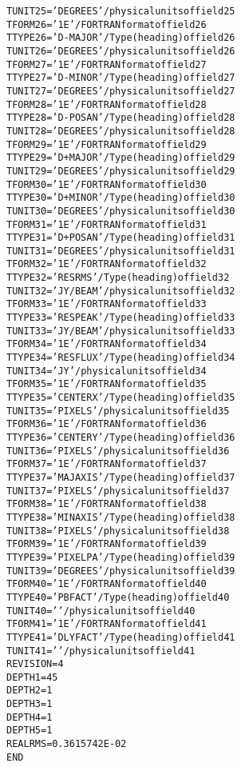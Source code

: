 \documentclass[twoside]{article}
\begin{document}
\begin{alltt}
TUNIT25 = 'DEGREES '           / physical units of field 25
TFORM26 = '1E      '           / FORTRAN format of field 26
TTYPE26 = 'D- MAJOR        '   / Type (heading) of field 26
TUNIT26 = 'DEGREES '           / physical units of field 26
TFORM27 = '1E      '           / FORTRAN format of field 27
TTYPE27 = 'D- MINOR        '   / Type (heading) of field 27
TUNIT27 = 'DEGREES '           / physical units of field 27
TFORM28 = '1E      '           / FORTRAN format of field 28
TTYPE28 = 'D- POSAN        '   / Type (heading) of field 28
TUNIT28 = 'DEGREES '           / physical units of field 28
TFORM29 = '1E      '           / FORTRAN format of field 29
TTYPE29 = 'D+ MAJOR        '   / Type (heading) of field 29
TUNIT29 = 'DEGREES '           / physical units of field 29
TFORM30 = '1E      '           / FORTRAN format of field 30
TTYPE30 = 'D+ MINOR        '   / Type (heading) of field 30
TUNIT30 = 'DEGREES '           / physical units of field 30
TFORM31 = '1E      '           / FORTRAN format of field 31
TTYPE31 = 'D+ POSAN        '   / Type (heading) of field 31
TUNIT31 = 'DEGREES '           / physical units of field 31
TFORM32 = '1E      '           / FORTRAN format of field 32
TTYPE32 = 'RES RMS         '   / Type (heading) of field 32
TUNIT32 = 'JY/BEAM '           / physical units of field 32
TFORM33 = '1E      '           / FORTRAN format of field 33
TTYPE33 = 'RES PEAK        '   / Type (heading) of field 33
TUNIT33 = 'JY/BEAM '           / physical units of field 33
TFORM34 = '1E      '           / FORTRAN format of field 34
TTYPE34 = 'RES FLUX        '   / Type (heading) of field 34
TUNIT34 = 'JY      '           / physical units of field 34
TFORM35 = '1E      '           / FORTRAN format of field 35
TTYPE35 = 'CENTER X        '   / Type (heading) of field 35
TUNIT35 = 'PIXELS  '           / physical units of field 35
TFORM36 = '1E      '           / FORTRAN format of field 36
TTYPE36 = 'CENTER Y        '   / Type (heading) of field 36
TUNIT36 = 'PIXELS  '           / physical units of field 36
TFORM37 = '1E      '           / FORTRAN format of field 37
TTYPE37 = 'MAJ AXIS        '   / Type (heading) of field 37
TUNIT37 = 'PIXELS  '           / physical units of field 37
TFORM38 = '1E      '           / FORTRAN format of field 38
TTYPE38 = 'MIN AXIS        '   / Type (heading) of field 38
TUNIT38 = 'PIXELS  '           / physical units of field 38
TFORM39 = '1E      '           / FORTRAN format of field 39
TTYPE39 = 'PIXEL PA        '   / Type (heading) of field 39
TUNIT39 = 'DEGREES '           / physical units of field 39
TFORM40 = '1E      '           / FORTRAN format of field 40
TTYPE40 = 'PB FACT         '   / Type (heading) of field 40
TUNIT40 = '        '           / physical units of field 40
TFORM41 = '1E      '           / FORTRAN format of field 41
TTYPE41 = 'DLY FACT        '   / Type (heading) of field 41
TUNIT41 = '        '           / physical units of field 41
REVISION=            4
DEPTH1  =           45
DEPTH2  =            1
DEPTH3  =            1
DEPTH4  =            1
DEPTH5  =            1
REALRMS =   0.3615742E-02
END
\end{alltt}
\end{document}
